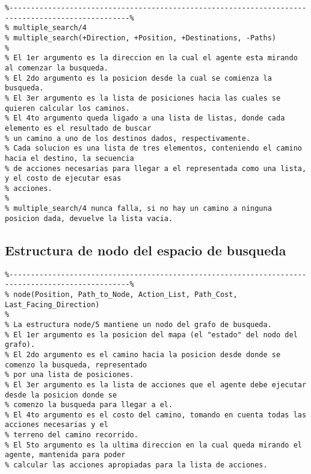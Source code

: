 \documentclass[a4paper,12pt]{report}
\begin{document}
\begin{scriptsize}
\begin{verbatim}
%--------------------------------------------------------------------------------------------------%
% multiple_search/4
% multiple_search(+Direction, +Position, +Destinations, -Paths)
%
% El 1er argumento es la direccion en la cual el agente esta mirando al comenzar la busqueda.
% El 2do argumento es la posicion desde la cual se comienza la busqueda.
% El 3er argumento es la lista de posiciones hacia las cuales se quieren calcular los caminos.
% El 4to argumento queda ligado a una lista de listas, donde cada elemento es el resultado de buscar
% un camino a uno de los destinos dados, respectivamente. 
% Cada solucion es una lista de tres elementos, conteniendo el camino hacia el destino, la secuencia
% de acciones necesarias para llegar a el representada como una lista, y el costo de ejecutar esas 
% acciones.
%
% multiple_search/4 nunca falla, si no hay un camino a ninguna posicion dada, devuelve la lista vacia.
\end{verbatim}
\end{scriptsize}

\subsection{Estructura de nodo del espacio de busqueda}

\begin{scriptsize}
\begin{verbatim}
%--------------------------------------------------------------------------------------------------%
% node(Position, Path_to_Node, Action_List, Path_Cost, Last_Facing_Direction)
%
% La estructura node/5 mantiene un nodo del grafo de busqueda. 
% El 1er argumento es la posicion del mapa (el "estado" del nodo del grafo).
% El 2do argumento es el camino hacia la posicion desde donde se comenzo la busqueda, representado
% por una lista de posiciones. 
% El 3er argumento es la lista de acciones que el agente debe ejecutar desde la posicion donde se
% comenzo la busqueda para llegar a el. 
% El 4to argumento es el costo del camino, tomando en cuenta todas las acciones necesarias y el 
% terreno del camino recorrido.
% El 5to argumento es la ultima direccion en la cual queda mirando el agente, mantenida para poder
% calcular las acciones apropiadas para la lista de acciones.
\end{verbatim}
\end{scriptsize}
\end{document}
